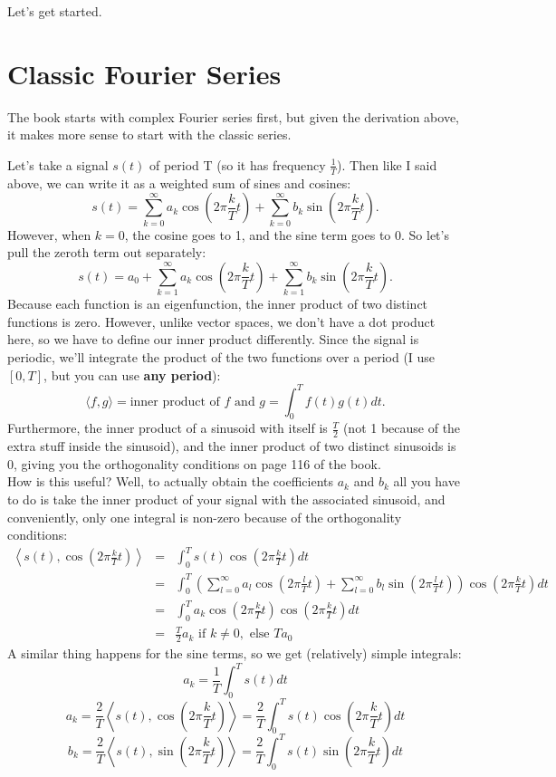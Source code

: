 \documentclass[11pt]{article}
\begin{document}
Let's get started.

\section*{Classic Fourier Series}
The book starts with complex Fourier series first, but given the derivation above, it makes more sense to start with the classic series.

\noindent Let's take a signal $s(t)$ of period T (so it has frequency $\frac{1}{T}$). Then like I said above, we can write it as a weighted sum of sines and cosines:
\[s(t) = \sum_{k=0}^{\infty} a_k \cos{\left(2 \pi \frac{k}{T} t \right)} + \sum_{k=0}^{\infty} b_k\sin{\left(2 \pi \frac{k}{T} t \right)}. \]
However, when $k=0$, the cosine goes to 1, and the sine term goes to 0. So let's pull the zeroth term out separately:
\[s(t) = a_0 + \sum_{k=1}^{\infty} a_k \cos{\left(2 \pi \frac{k}{T} t \right)} + \sum_{k=1}^{\infty} b_k\sin{\left(2 \pi \frac{k}{T} t \right)}. \]
Because each function is an eigenfunction, the inner product of two distinct functions is zero. However, unlike vector spaces, we don't have a dot product here, so we have to define our inner product differently. Since the signal is periodic, we'll integrate the product of the two functions over a period (I use $[0,T]$, but you can use {\bf any period}):
\[ \langle f,g \rangle = \mbox{inner product of $f$ and $g$} = \int_0^T f(t)g(t) dt.\]
Furthermore, the inner product of a sinusoid with itself is $\frac{T}{2}$ (not 1 because of the extra stuff inside the sinusoid), and the inner product of two distinct sinusoids is 0, giving you the orthogonality conditions on page 116 of the book.\\

\noindent How is this useful? Well, to actually obtain the coefficients $a_k$ and $b_k$ all you have to do is take the inner product of your signal with the associated sinusoid, and conveniently, only one integral is non-zero because of the orthogonality conditions:
\begin{eqnarray*}
\left\langle s(t), \cos{\left(2 \pi \frac{k}{T} t \right)}\right\rangle &=& \int_0^T s(t) \cos{\left(2 \pi \frac{k}{T} t \right)} dt \\
&=& \int_0^T \left(\sum_{l=0}^{\infty} a_l \cos{\left(2 \pi \frac{l}{T} t \right)} + \sum_{l=0}^{\infty} b_l\sin{\left(2 \pi \frac{l}{T} t \right)} \right) \cos{\left(2 \pi \frac{k}{T} t \right)} dt \\
&=& \int_0^T a_k \cos{\left(2 \pi \frac{k}{T} t \right)} \cos{\left(2 \pi \frac{k}{T} t \right)} dt \\
&=& \frac{T}{2} a_k \mbox{ if } k \neq 0, \mbox{ else } T a_0
\end{eqnarray*}
A similar thing happens for the sine terms, so we get (relatively) simple integrals:
\[ a_k = \frac{1}{T} \int_0^T s(t) dt \]
\[ a_k = \frac{2}{T} \left\langle s(t), \cos{\left(2 \pi \frac{k}{T} t \right)}\right\rangle = \frac{2}{T} \int_0^T s(t) \cos{\left(2 \pi \frac{k}{T} t \right)} dt \]
\[ b_k = \frac{2}{T} \left\langle s(t), \sin{\left(2 \pi \frac{k}{T} t \right)}\right\rangle = \frac{2}{T} \int_0^T s(t) \sin{\left(2 \pi \frac{k}{T} t \right)} dt \]
\end{document}
